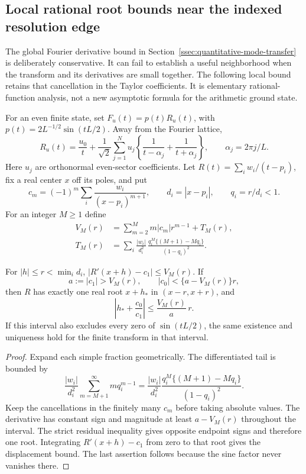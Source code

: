\subsection{Local rational root bounds near the indexed resolution edge}
\label{ssec:local-rational-root-bound}

The global Fourier derivative bound in
Section~\ref{ssec:quantitative-mode-transfer} is deliberately conservative.
It can fail to establish a useful neighborhood when the transform and its
derivatives are small together. The following local bound retains that
cancellation in the Taylor coefficients. It is elementary rational-function
analysis, not a new asymptotic formula for the arithmetic ground state.

For an even finite state, set $F_u(t)=p(t)R_u(t)$, with
$p(t)=2L^{-1/2}\sin(tL/2)$. Away from the Fourier lattice,
\[
 R_u(t)=\frac{u_0}{t}+\frac1{\sqrt2}\sum_{j=1}^N u_j
 \left\{\frac1{t-\alpha_j}+\frac1{t+\alpha_j}\right\},
 \qquad \alpha_j=2\pi j/L.
\]
Here $u_j$ are orthonormal even-sector coefficients. Let
$R(t)=\sum_i w_i/(t-p_i)$, fix a real center $x$ off its poles, and put
\[
 c_m=(-1)^m\sum_i\frac{w_i}{(x-p_i)^{m+1}},\qquad
 d_i=|x-p_i|,\qquad q_i=r/d_i<1.
\]
For an integer $M\ge1$ define
\begin{align*}
 V_M(r)&=\sum_{m=2}^M m|c_m|r^{m-1}+T_M(r),\\
 T_M(r)&=\sum_i\frac{|w_i|}{d_i^2}\,
 \frac{q_i^M\{(M+1)-Mq_i\}}{(1-q_i)^2}.
\end{align*}

\begin{proposition}
\label{prop:local-rational-root-bound}
For $|h|\le r<\min_i d_i$,
$|R'(x+h)-c_1|\le V_M(r)$. If
\[
 a:=|c_1|>V_M(r),\qquad |c_0|<\{a-V_M(r)\}r,
\]
then $R$ has exactly one real root $x+h_*$ in $(x-r,x+r)$, and
\[
 \left|h_*+\frac{c_0}{c_1}\right|\le\frac{V_M(r)}a\,r.
\]
If this interval also excludes every zero of $\sin(tL/2)$, the same
existence and uniqueness hold for the finite transform in that interval.
\end{proposition}
\begin{proof}
Expand each simple fraction geometrically. The differentiated tail is
bounded by
\[
 \frac{|w_i|}{d_i^2}\sum_{m=M+1}^\infty m q_i^{m-1}
 =\frac{|w_i|}{d_i^2}
 \frac{q_i^M\{(M+1)-Mq_i\}}{(1-q_i)^2}.
\]
Keep the cancellations in the finitely many $c_m$ before taking absolute
values. The derivative has constant sign and magnitude at least
$a-V_M(r)$ throughout the interval. The strict residual inequality
gives opposite endpoint signs and therefore one root. Integrating
$R'(x+h)-c_1$ from zero to that root gives the displacement bound.
The last assertion follows because the sine factor never vanishes there.
\end{proof}

